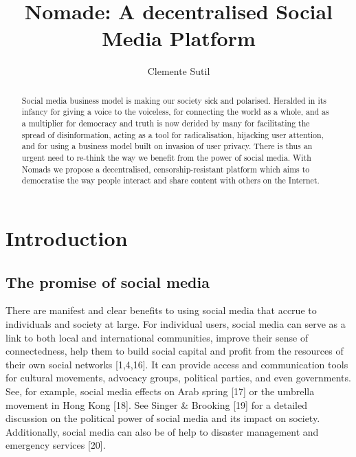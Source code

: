 \documentclass{sistedes}
\begin{document}
\title{Nomade: A decentralised Social Media Platform}

\author{Clemente Sutil }


\maketitle

\small


\begin{abstract}
Social media business model is making our society sick and polarised. Heralded in its infancy for giving a voice to the voiceless, for connecting the world as a whole, and as a multiplier for democracy and truth is now derided by many for facilitating the spread of disinformation, acting as a tool for radicalisation, hijacking user attention, and for using a business model built on invasion of user privacy. There is thus an urgent need to re-think the way we benefit from the power of social media. With Nomads we propose a decentralised, censorship-resistant platform which aims to democratise the way people interact and share content with others on the Internet.
\end{abstract}

\section{Introduction}
\subsection{The promise of social media}
There are manifest and clear benefits to using social media that accrue to individuals and society at large. For individual users, social media can serve as a link to both local and international communities, improve their sense of connectedness, help them to build social capital and profit from the resources of their own social networks [1,4,16]. It can provide access and communication tools for cultural movements, advocacy groups, political parties, and even governments. See, for example, social media effects on Arab spring [17] or the umbrella movement in Hong Kong [18]. See Singer \& Brooking [19] for a detailed discussion on the political power of social media and its impact on society. Additionally, social media can also be of help to disaster management and emergency services [20].
\end{document}
